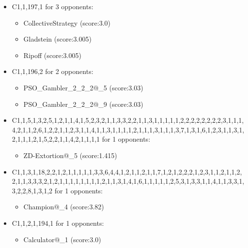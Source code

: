 \begin{appendices}
\begin{itemize}
        \item C1,1,197,1 for 3 opponents:
        \begin{multicols}{3}
            \begin{itemize}
                \item CollectiveStrategy (score:3.0)
                \item Gladstein (score:3.005)
                \item Ripoff (score:3.005)
            \end{itemize}
        \end{multicols}

        \item C1,1,196,2 for 2 opponents:
        \begin{multicols}{3}
            \begin{itemize}
                \item PSO\_Gambler\_2\_2\_2@\_5 (score:3.03)
                \item PSO\_Gambler\_2\_2\_2@\_9 (score:3.03)
            \end{itemize}
        \end{multicols}

        \item C1,1,5,1,3,2,5,1,2,1,1,4,1,5,2,3,2,1,1,3,3,2,2,1,1,3,1,1,1,1,1,2,2,2,2,2,2,2,2,3,1,1,1,4,2,1,1,2,6,1,2,2,1,1,2,3,1,1,4,1,1,3,1,1,1,1,2,1,1,1,3,1,1,1,3,7,1,3,1,6,1,2,3,1,1,3,1,2,1,1,1,2,1,5,2,2,1,1,4,2,1,1,1,1 for 1 opponents:
        \begin{multicols}{3}
            \begin{itemize}
                \item ZD-Extortion@\_5 (score:1.415)
            \end{itemize}
        \end{multicols}

        \item C1,1,3,1,18,2,2,1,2,1,1,1,1,1,3,3,6,4,4,1,2,1,1,2,1,1,7,1,2,1,2,2,2,1,2,3,1,1,2,1,1,2,2,1,1,3,3,3,2,1,2,1,1,1,1,1,1,1,1,2,1,1,3,1,4,1,6,1,1,1,1,1,2,5,3,1,3,3,1,1,4,1,1,3,3,1,3,2,2,8,1,3,1,2 for 1 opponents:
        \begin{multicols}{3}
            \begin{itemize}
                \item Champion@\_4 (score:3.82)
            \end{itemize}
        \end{multicols}

        \item C1,1,2,1,194,1 for 1 opponents:
        \begin{multicols}{3}
            \begin{itemize}
                \item Calculator@\_1 (score:3.0)
            \end{itemize}
        \end{multicols}


\end{itemize}
\end{appendices}
